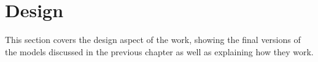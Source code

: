 \chapter{Design}

This section covers the design aspect of the work, showing the final versions of the models discussed in the previous chapter as well as explaining how they work. 














